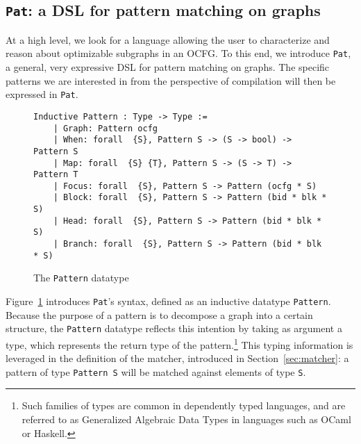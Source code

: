 \documentclass[11pt]{article}
\newcommand{\inlinecoq}[1]{\mbox{\lstinline[style=customcoq,columns=fixed,basewidth=.48em]{#1}}}
\newcommand{\ilc}[1]{\inlinecoq{#1}}
\newcommand{\yzt}[1]{\textcolor{ForestGreen!50}{#1}}
\newcommand{\cut}[1]{\textcolor{Gray!40}{#1}}
\newcommand{\ocfg}{OCFG\xspace}
\newcommand{\pat}{\texttt{Pat}\xspace}
\begin{document}

\subsection{\pat: a DSL for pattern matching on graphs}

\yzt{At a high level, we look for a language allowing the user to characterize and reason about optimizable subgraphs in an \ocfg. 
To this end, we introduce \pat, a general, very expressive DSL for pattern matching on graphs. The specific patterns we are interested in from the perspective of compilation will then be expressed in \pat.}

\begin{figure}
  \begin{lstlisting}[style=customcoq,basicstyle=\small\ttfamily]
    Inductive Pattern : Type -> Type :=
    | Graph: Pattern ocfg
    | When: forall  {S}, Pattern S -> (S -> bool) -> Pattern S
    | Map: forall  {S} {T}, Pattern S -> (S -> T) -> Pattern T
    | Focus: forall  {S}, Pattern S -> Pattern (ocfg * S)
    | Block: forall  {S}, Pattern S -> Pattern (bid * blk * S)
    | Head: forall  {S}, Pattern S -> Pattern (bid * blk * S)
    | Branch: forall  {S}, Pattern S -> Pattern (bid * blk * S)
  \end{lstlisting}
  \caption{The \ilc{Pattern} datatype}
  \label{fig:pat}
\end{figure}

Figure~\ref{fig:pat} introduces \pat{}'s syntax, defined as an inductive datatype \ilc{Pattern}.
Because the purpose of a pattern is to decompose a graph into a certain structure, the \ilc{Pattern} datatype reflects this intention by taking as argument a type, which represents the return type of the pattern.\footnote{Such families of types are common in dependently typed languages, and are referred to as Generalized Algebraic Data Types in languages such as OCaml or Haskell.}
This typing information is leveraged in the definition of the matcher, introduced in Section~\ref{sec:matcher}: a pattern of type \ilc{Pattern S} will be matched against elements of type \ilc{S}.
\end{document}
